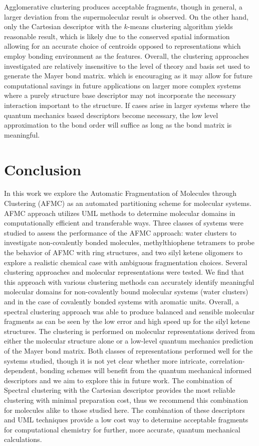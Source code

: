 Agglomerative clustering produces acceptable fragments, though in general, a larger deviation from the supermolecular result is observed.  
On the other hand, only the Cartesian descriptor with the $k$-means clustering algorithm yields reasonable result, which is likely due to the conserved spatial information allowing for an accurate choice of centroids opposed to representations which employ bonding environment as the features. 
Overall, the clustering approaches investigated are relatively insensitive to the level of theory and basis set used to generate the Mayer bond matrix. which is encouraging as it may allow for future computational savings in future applications on larger more complex systems where a purely structure base descriptor may not incorporate the necessary interaction important to the structure.
If cases arise in larger systems where the quantum mechanics based descriptors become necessary, the low level approximation to the bond order will suffice as long as the bond matrix is meaningful.



\section{Conclusion}
In this work we explore the Automatic Fragmentation of Molecules through Clustering (AFMC) as an automated partitioning scheme for molecular systems.
AFMC approach utilizes UML methods to determine molecular domains in computationally efficient and transferable ways.
Three classes of systems were studied to assess the performance of the AFMC approach: water clusters to investigate non-covalently bonded molecules, methylthiophene tetramers to probe the behavior of AFMC with ring structures, and two silyl ketene oligomers to explore a realistic chemical case with ambiguous fragmentation choices.
Several clustering approaches and molecular representations were tested.
We find that this approach with various clustering methods can accurately identify meaningful molecular domains for non-covalently bound molecular systems (water clusters) and in the case of covalently bonded systems with aromatic units.
Overall, a spectral clustering approach was able to produce balanced and sensible molecular fragments as can be seen by the low error and high speed up for the silyl ketene structures.
The clustering is performed on molecular representations derived from either the molecular structure alone or a low-level quantum mechanics prediction of the Mayer bond matrix.
Both classes of representations performed well for the systems studied, though it is not yet clear whether more intricate, correlation-dependent, bonding schemes will benefit from the quantum mechanical informed descriptors and we aim to explore this in future work. 
The combination of Spectral clustering with the Cartesian descriptor provides the most reliable clustering with minimal preparation cost, thus we recommend this combination for molecules alike to those studied here.
The combination of these descriptors and UML techniques provide a low cost way to determine acceptable fragments for computational chemistry for further, more accurate, quantum mechanical calculations. 



